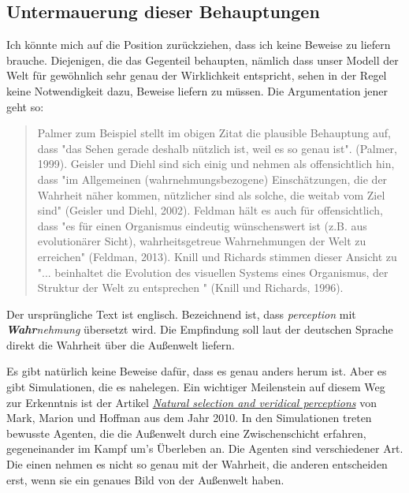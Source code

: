 \documentclass[12pt]{book}
\begin{document}
\subsection{Untermauerung dieser Behauptungen}

Ich könnte mich auf die Position zurückziehen, dass ich keine Beweise zu liefern brauche. Diejenigen, die das Gegenteil behaupten, nämlich dass unser Modell der Welt für gewöhnlich sehr genau der Wirklichkeit entspricht, sehen in der Regel keine Notwendigkeit dazu, Beweise liefern zu müssen. Die Argumentation jener geht so:


\begin{quote}\begin{tcolorbox}
Palmer zum Beispiel stellt im obigen Zitat die plausible Behauptung auf, dass "das Sehen gerade deshalb nützlich ist, weil es so genau ist". (Palmer, 1999). Geisler und Diehl sind sich einig und nehmen als offensichtlich hin, dass "im Allgemeinen (wahrnehmungsbezogene) Einschätzungen, die der Wahrheit näher kommen, nützlicher sind als solche, die weitab vom Ziel sind" (Geisler und Diehl, 2002). Feldman hält es auch für offensichtlich, dass "es für einen Organismus eindeutig wünschenswert ist (z.B. aus evolutionärer Sicht), wahrheitsgetreue Wahrnehmungen der Welt zu erreichen" (Feldman, 2013). Knill und Richards stimmen dieser Ansicht zu "... beinhaltet die Evolution des visuellen Systems eines Organismus, der Struktur der Welt zu entsprechen " (Knill und Richards, 1996).
\end{tcolorbox}\end{quote}

Der ursprüngliche Text ist englisch. Bezeichnend ist, dass \emph{perception} mit \emph{\textbf{Wahr}nehmung} übersetzt wird. Die Empfindung soll laut der deutschen Sprache direkt die Wahrheit über die Außenwelt liefern.

Es gibt natürlich keine Beweise dafür, dass es genau anders herum ist. Aber es gibt Simulationen, die es nahelegen. Ein wichtiger Meilenstein auf diesem Weg zur Erkenntnis ist der Artikel \href{http://cogsci.uci.edu/~ddhoff/PerceptualEvolution.pdf}{\emph{Natural selection and veridical perceptions}} von Mark, Marion und Hoffman aus dem Jahr 2010. In den Simulationen treten bewusste Agenten, die die Außenwelt durch eine Zwischenschicht erfahren, gegeneinander im Kampf um's Überleben an. Die Agenten sind verschiedener Art. Die einen nehmen es nicht so genau mit der Wahrheit, die anderen entscheiden erst, wenn sie ein genaues Bild von der Außenwelt haben.
\end{document}
